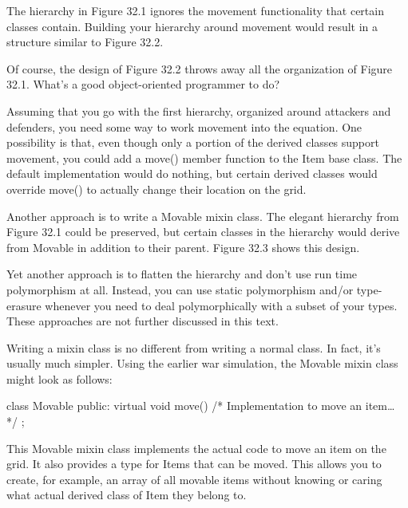 The hierarchy in Figure 32.1 ignores the movement functionality that certain classes contain. Building your hierarchy around movement would result in a structure similar to Figure 32.2.

Of course, the design of Figure 32.2 throws away all the organization of Figure 32.1. What’s a good object-oriented programmer to do?

Assuming that you go with the first hierarchy, organized around attackers and defenders, you need some way to work movement into the equation. One possibility is that, even though only a portion of the derived classes support movement, you could add a move() member function to the Item base class. The default implementation would do nothing, but certain derived classes would override move() to actually change their location on the grid.



Another approach is to write a Movable mixin class. The elegant hierarchy from Figure 32.1 could be preserved, but certain classes in the hierarchy would derive from Movable in addition to their parent. Figure 32.3 shows this design.


Yet another approach is to flatten the hierarchy and don’t use run time polymorphism at all. Instead, you can use static polymorphism and/or type-erasure whenever you need to deal polymorphically with a subset of your types. These approaches are not further discussed in this text.


Writing a mixin class is no different from writing a normal class. In fact, it’s usually much simpler. Using the earlier war simulation, the Movable mixin class might look as follows:

\begin{cpp}
class Movable
{
    public:
        virtual void move() { /* Implementation to move an item… */ }
};
\end{cpp}

This Movable mixin class implements the actual code to move an item on the grid. It also provides a type for Items that can be moved. This allows you to create, for example, an array of all movable items without knowing or caring what actual derived class of Item they belong to.

